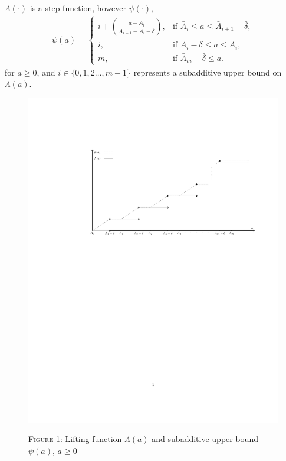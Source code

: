 \documentclass[10pt,twoside]{amsart}
\begin{document}
$\Lambda(\cdot)$ is a step function, however $\psi(\cdot)$,
\begin{align}
  \psi(a) =  \begin{cases}
                   i + \left(\frac{a-\bar{A}_i}{\bar{A}_{i+1} - \bar{A}_i - \bar{\delta}}\right), & \mbox{if } \bar{A}_i \leq a \leq \bar{A}_{i+1} - \bar{\delta},\\
                   i, &  \mbox{if } \bar{A}_{i} - \bar{\delta} \leq a \leq \bar{A}_{i},\\
                   m, &  \mbox{if } \bar{A}_{m} - \bar{\delta} \leq a.
                \end{cases}
\end{align}
for $a\geq 0$, and $i \in \{0,1,2\ldots,m-1\}$ represents a subadditive upper bound on $\Lambda(a)$.

\begin{figure}[h]
  \centering
  \includegraphics[scale = 1]{Subadditivebound}\\
  \caption*{\small \textsc{Figure 1}: Lifting function $\Lambda(a)$ and subadditive upper bound $\psi(a)$, $a\geq 0$}\label{fig:subadditive}
\end{figure}
\end{document}
